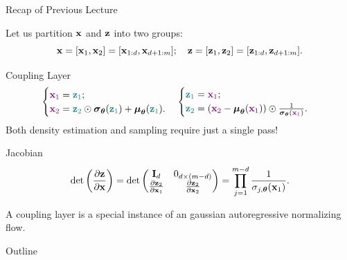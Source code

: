 \documentclass{beamer}
\begin{document}
\begin{frame}{Recap of Previous Lecture}

	Let us partition $\mathbf{x}$ and $\mathbf{z}$ into two groups: 
	\[
	\mathbf{x} = [\mathbf{x}_1, \mathbf{x}_2] = [\mathbf{x}_{1:d}, \mathbf{x}_{d+1:m}]; \quad \mathbf{z} = [\mathbf{z}_1, \mathbf{z}_2] = [\mathbf{z}_{1:d}, \mathbf{z}_{d+1:m}].
	\]
	\vspace{-0.7cm}
	\begin{block}{Coupling Layer}
		\vspace{-0.7cm}
		\[
		\begin{cases} {\color{violet}\mathbf{x}_1} = {\color{teal}\mathbf{z}_1}; \\ {\color{violet}\mathbf{x}_2} = {\color{teal}\mathbf{z}_2} \odot \boldsymbol{\sigma}_{\boldsymbol{\theta}}({\color{teal}\mathbf{z}_1}) + \boldsymbol{\mu}_{\boldsymbol{\theta}}({\color{teal}\mathbf{z}_1}).\end{cases}  
		\begin{cases} {\color{teal}\mathbf{z}_1} ={\color{violet} \mathbf{x}_1}; \\ {\color{teal}\mathbf{z}_2} = \left({\color{violet}\mathbf{x}_2} - \boldsymbol{\mu}_{\boldsymbol{\theta}}({\color{violet}\mathbf{x}_1}) \right) \odot \frac{1}{\boldsymbol{\sigma}_{\boldsymbol{\theta}}({\color{violet}\mathbf{x}_1})}.\end{cases}
		\]
		Both density estimation and sampling require just a single pass!
	\end{block}
	\begin{block}{Jacobian}
		\vspace{-0.3cm}
		\[
		\det \left( \frac{\partial \mathbf{z}}{\partial \mathbf{x}} \right) = \det 
		\begin{pmatrix}
			\mathbf{I}_d & 0_{d \times (m - d)} \\
			\frac{\partial \mathbf{z}_2}{\partial \mathbf{x}_1} & \frac{\partial \mathbf{z}_2}{\partial \mathbf{x}_2}
		\end{pmatrix} = \prod_{j=1}^{m - d} \frac{1}{\sigma_{j, \boldsymbol{\theta}}(\mathbf{x}_1)}.
		\]
	\end{block}
	A coupling layer is a special instance of an gaussian autoregressive normalizing flow.
\end{frame}
\begin{frame}{Outline}
    \tableofcontents
\end{frame}
\end{document}
